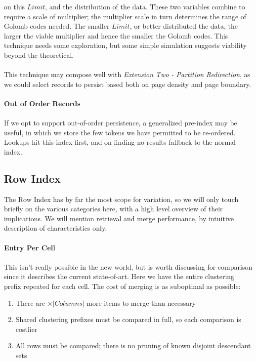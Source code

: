 \documentclass[fleqn]{article}
\begin{document}
\begin{enumerate}
        on this $Limit$, and the distribution of the data. These two variables combine to require a scale of 
        multiplier; the multiplier scale in turn determines the range of Golomb codes needed.
        The smaller $Limit$, or better distributed the data, the larger the viable multiplier and hence the 
        smaller the Golomb codes. This technique needs some exploration, but some simple simulation suggests
        viability beyond the theoretical.
        \\\\
        This technique may compose well with \textit{Extension Two - Partition Redirection}, as we could
        select records to persist based both on page density and page boundary.
    \end{enumerate}

\small
\paragraph{Out of Order Records}
\paragraph{}
    If we opt to support out-of-order persistence, a generalized pre-index may be useful, in which we store 
    the few tokens we have permitted to be re-ordered. Lookups hit this index first, and on finding no results
    fallback to the normal index.

\subsection{Row Index}
The Row Index has by far the most scope for variation, so we will only touch briefly on the various
categories here, with a high level overview of their implications. We will mention retrieval and
merge performance, by intuitive description of characteristics only.
\paragraph{Entry Per Cell}
\paragraph{}
    This isn't really possible in the new world, but is worth discussing for comparison since it
    describes the current state-of-art. Here we have the entire clustering prefix repeated for each cell.
    The cost of merging is as suboptimal as possible: 
    \begin{enumerate}
      \item There are $\times \lvert Columns \rvert$ more items to merge than necessary
      \item Shared clustering prefixes must be compared in full, so each comparison is costlier
      \item All rows must be compared; there is no pruning of known disjoint descendant sets 
    \end{enumerate}
\clearpage
\end{document}
